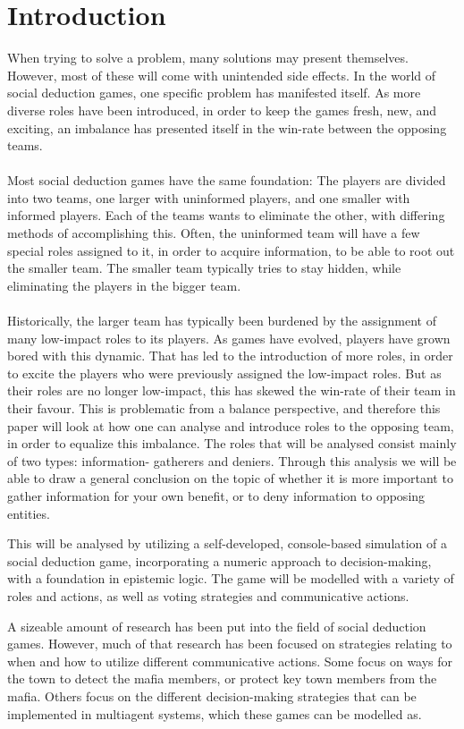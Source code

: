 \section{Introduction}
When trying to solve a problem, many solutions may present themselves. However,
most of these will come with unintended side effects. In the world of social
deduction games, one specific problem has manifested itself. As more diverse
roles have been introduced, in order to keep the games fresh, new, and
exciting, an imbalance has presented itself in the win-rate between the
opposing teams. \\ \\ Most social deduction games have the same foundation: The
players are divided into two teams, one larger with uninformed players, and one
smaller with informed players. Each of the teams wants to eliminate the other,
with differing methods of accomplishing this. Often, the uninformed team will
have a few special roles assigned to it, in order to acquire information, to be
able to root out the smaller team. The smaller team typically tries to stay
hidden, while eliminating the players in the bigger team.\\ \\ Historically,
the larger team has typically been burdened by the assignment of many
low-impact roles to its players. As games have evolved, players have grown
bored with this dynamic. That has led to the introduction of more roles, in
order to excite the players who were previously assigned the low-impact roles.
But as their roles are no longer low-impact, this has skewed the win-rate of
their team in their favour. This is problematic from a balance perspective, and
therefore this paper will look at how one can analyse and introduce roles to
the opposing team, in order to equalize this imbalance. The roles that will be
analysed consist mainly of two types: information- gatherers and deniers.
Through this analysis we will be able to draw a general conclusion on the topic
of whether it is more important to gather information for your own benefit, or
to deny information to opposing entities.

This will be analysed by utilizing a self-developed, console-based simulation
of a social deduction game, incorporating a numeric approach to
decision-making, with a foundation in epistemic logic. The game will be
modelled with a variety of roles and actions, as well as voting strategies and
communicative actions.

A sizeable amount of research has been put into the field of social deduction
games. However, much of that research has been focused on strategies relating
to when and how to utilize different communicative actions\cite{commitment}.
Some focus on ways for the town to detect the mafia
members\cite{werewolf_stealth}, or protect key town members from the
mafia\cite{werewolf_nash_equilibrium}. Others focus on the different
decision-making strategies that can be implemented in multiagent systems, which
these games can be modelled
as\cite{modelling_multi_agent_epistemic_systems}\cite{multi_agent_epistemic_planner_common_knowledge}\cite{probibalistic_multiagent_systems}.

